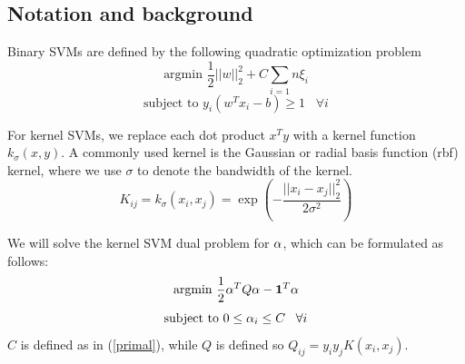 \subsection{Notation and background}
Binary SVMs are defined by the following quadratic optimization problem 
\begin{equation}
	\text{argmin } \frac{1}{2} ||w||_2^2 + C \sum_{i=1}{n} \xi_i
	\label{primal}
\end{equation}
\begin{equation}
	\text{subject to } y_i(w^T x_i - b) \geq 1 \,\,\,\,\, \forall i
	\label{primal_constraint}
\end{equation}

For kernel SVMs, we replace each dot product $ x^T y $ with a kernel function $k_{\sigma}(x,y)$. 
A commonly used kernel is the Gaussian or radial basis function (rbf) kernel, where we use $\sigma$ to denote the bandwidth of the kernel.
\[
	K_{ij} = k_{\sigma}(x_i,x_j) = \exp \left(-\frac{||x_i - x_j||^2_2}{2 \sigma^2}\right)
\]

We will solve the kernel SVM dual problem for $\alpha$, which can be formulated as follows:
\begin{equation}
	\text{argmin } \frac{1}{2} \alpha^T Q \alpha - \boldsymbol{1}^T \alpha
	\label{dual}
\end{equation}
\begin{equation}
	\text{subject to } 0 \leq \alpha_i \leq C \,\,\,\,\, \forall i
	\label{dual_constraint}
\end{equation}
$C$ is defined as in (\ref{primal}), while $Q$ is defined so $Q_{ij} = y_i y_j K(x_i,x_j)$.

